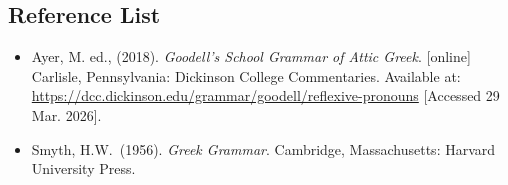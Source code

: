 \documentclass[10pt,a4paper,notitlepage]{article}
\begin{document}
    \subsection*{Reference List}
    \begin{itemize}[label={}, leftmargin=0]
        \item Ayer, M. ed., (2018). \textit{Goodell’s School Grammar of Attic Greek}. [online] Carlisle, Pennsylvania: Dickinson College Commentaries. Available at: \url{https://dcc.dickinson.edu/grammar/goodell/reflexive-pronouns} [Accessed 29 Mar. 2026].
        \item Smyth, H.W.\ (1956). \textit{Greek Grammar}. Cambridge, Massachusetts: Harvard University Press.
    \end{itemize}
\end{document}
